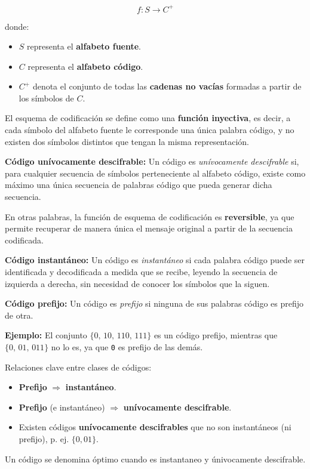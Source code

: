 \documentclass[11pt,a4paper]{article}
\begin{document}
\[
f: S \rightarrow C^{+}
\]

donde:
\begin{itemize}
    \item $S$ representa el \textbf{alfabeto fuente}.
    \item $C$ representa el \textbf{alfabeto código}.
    \item $C^{+}$ denota el conjunto de todas las \textbf{cadenas no vacías} formadas a partir de los símbolos de $C$.
\end{itemize}

El esquema de codificación se define como una \textbf{función inyectiva}, es decir, a cada símbolo del alfabeto fuente le corresponde una única palabra código, y no existen dos símbolos distintos que tengan la misma representación.

\textbf{Código unívocamente descifrable:}
Un código es \emph{unívocamente descifrable} si, para cualquier secuencia de símbolos perteneciente al alfabeto código,
existe como máximo una única secuencia de palabras código que pueda generar dicha secuencia.

En otras palabras, la función de esquema de codificación es \textbf{reversible},
ya que permite recuperar de manera única el mensaje original a partir de la secuencia codificada.

\textbf{Código instantáneo:}
Un código es \emph{instantáneo} si cada palabra código puede ser identificada y decodificada a medida que se recibe,
leyendo la secuencia de izquierda a derecha, sin necesidad de conocer los símbolos que la siguen.

\textbf{Código prefijo:}
Un código es \emph{prefijo} si ninguna de sus palabras código es prefijo de otra.

\medskip

\textbf{Ejemplo:}
El conjunto $\{0,\, 10,\, 110,\, 111\}$ es un código prefijo,
mientras que $\{0,\, 01,\, 011\}$ no lo es, ya que \texttt{0} es prefijo de las demás.

\begin{NotaBox}
Relaciones clave entre clases de códigos:
\begin{itemize}
	\item \textbf{Prefijo} $\Rightarrow$ \textbf{instantáneo}.
	\item \textbf{Prefijo} (e instantáneo) $\Rightarrow$ \textbf{unívocamente descifrable}.
	\item Existen códigos \textbf{unívocamente descifrables} que no son instantáneos (ni prefijo), p. ej. $\{0,01\}$.
\end{itemize}
\end{NotaBox}

\begin{NotaBox}
Un código se denomina óptimo cuando es instantaneo y únivocamente descifrable.
\end{NotaBox}
\end{document}
